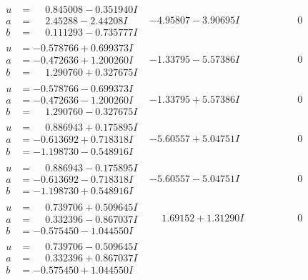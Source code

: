 \documentclass[1p]{elsarticle_modified}
\theoremstyle{definition}
\begin{document}
$$\begin{array}{c|c|c}
\begin{aligned}
u &= \phantom{-}0.845008 - 0.351940 I \\
a &= \phantom{-}2.45288 - 2.44208 I \\
b &= \phantom{-}0.111293 - 0.735777 I\end{aligned}
 & -4.95807 - 3.90695 I & \phantom{-0.000000 } 0 \\ \hline\begin{aligned}
u &= -0.578766 + 0.699373 I \\
a &= -0.472636 + 1.200260 I \\
b &= \phantom{-}1.290760 + 0.327675 I\end{aligned}
 & -1.33795 - 5.57386 I & \phantom{-0.000000 } 0 \\ \hline\begin{aligned}
u &= -0.578766 - 0.699373 I \\
a &= -0.472636 - 1.200260 I \\
b &= \phantom{-}1.290760 - 0.327675 I\end{aligned}
 & -1.33795 + 5.57386 I & \phantom{-0.000000 } 0 \\ \hline\begin{aligned}
u &= \phantom{-}0.886943 + 0.175895 I \\
a &= -0.613692 + 0.718318 I \\
b &= -1.198730 - 0.548916 I\end{aligned}
 & -5.60557 + 5.04751 I & \phantom{-0.000000 } 0 \\ \hline\begin{aligned}
u &= \phantom{-}0.886943 - 0.175895 I \\
a &= -0.613692 - 0.718318 I \\
b &= -1.198730 + 0.548916 I\end{aligned}
 & -5.60557 - 5.04751 I & \phantom{-0.000000 } 0 \\ \hline\begin{aligned}
u &= \phantom{-}0.739706 + 0.509645 I \\
a &= \phantom{-}0.332396 - 0.867037 I \\
b &= -0.575450 - 1.044550 I\end{aligned}
 & \phantom{-}1.69152 + 1.31290 I & \phantom{-0.000000 } 0 \\ \hline\begin{aligned}
u &= \phantom{-}0.739706 - 0.509645 I \\
a &= \phantom{-}0.332396 + 0.867037 I \\
b &= -0.575450 + 1.044550 I\end{aligned}

\end{array}$$
\end{document}
